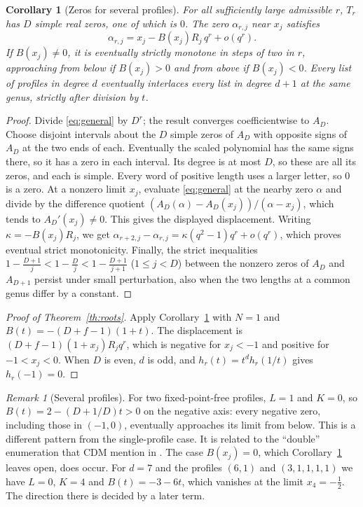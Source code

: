 \documentclass[11pt,a4paper]{article}
\newtheorem{corollary}[theorem]{Corollary}
\theoremstyle{definition}\newtheorem{definition}[theorem]{Definition}
\theoremstyle{remark}\newtheorem{remark}[theorem]{Remark}\newtheorem{example}[theorem]{Example}
\numberwithin{equation}{section}
\begin{document}
\begin{corollary}[Zeros for several profiles]\label{cor:multi}
For all sufficiently large admissible $r$, $T_r$ has $D$ simple real zeros, one of which is $0$. The zero $\alpha_{r,j}$ near $x_j$ satisfies
\[
 \alpha_{r,j}=x_j-B(x_j)R_j\,q^r+o(q^r).
\]
If $B(x_j)\ne0$, it is eventually strictly monotone in steps of two in $r$, approaching from below if $B(x_j)>0$ and from above if $B(x_j)<0$. Every list of profiles in degree $d$ eventually interlaces every list in degree $d+1$ at the same genus, strictly after division by $t$.
\end{corollary}
\begin{proof}
Divide \eqref{eq:general} by $D^r$; the result converges coefficientwise to $A_D$. Choose disjoint intervals about the $D$ simple zeros of $A_D$ with opposite signs of $A_D$ at the two ends of each. Eventually the scaled polynomial has the same signs there, so it has a zero in each interval. Its degree is at most $D$, so these are all its zeros, and each is simple. Every word of positive length uses a larger letter, so $0$ is a zero. At a nonzero limit $x_j$, evaluate \eqref{eq:general} at the nearby zero $\alpha$ and divide by the difference quotient $(A_D(\alpha)-A_D(x_j))/(\alpha-x_j)$, which tends to $A_D'(x_j)\ne0$. This gives the displayed displacement. Writing $\kappa=-B(x_j)R_j$, we get $\alpha_{r+2,j}-\alpha_{r,j}=\kappa(q^2-1)q^r+o(q^r)$, which proves eventual strict monotonicity. Finally, the strict inequalities $1-\frac{D+1}{j}<1-\frac Dj<1-\frac{D+1}{j+1}$ ($1\le j<D$) between the nonzero zeros of $A_D$ and $A_{D+1}$ persist under small perturbation, also when the two lengths at a common genus differ by a constant.
\end{proof}

\begin{proof}[Proof of Theorem~\ref{th:roots}]
Apply Corollary~\ref{cor:multi} with $N=1$ and $B(t)=-(D+f-1)(1+t)$. The displacement is $(D+f-1)(1+x_j)R_jq^r$, which is negative for $x_j<-1$ and positive for $-1<x_j<0$. When $D$ is even, $d$ is odd, and $h_r(t)=t^dh_r(1/t)$ gives $h_r(-1)=0$.
\end{proof}

\begin{remark}[Several profiles]\label{rem:double}
For two fixed-point-free profiles, $L=1$ and $K=0$, so $B(t)=2-(D+1/D)t>0$ on the negative axis: every negative zero, including those in $(-1,0)$, eventually approaches its limit from below. This is a different pattern from the single-profile case. It is related to the ``double'' enumeration that CDM mention in \cite[Remark~3.6]{cdm}. The case $B(x_j)=0$, which Corollary~\ref{cor:multi} leaves open, does occur. For $d=7$ and the profiles $(6,1)$ and $(3,1,1,1,1)$ we have $L=0$, $K=4$ and $B(t)=-3-6t$, which vanishes at the limit $x_4=-\frac12$. The direction there is decided by a later term.
\end{remark}
\end{document}
